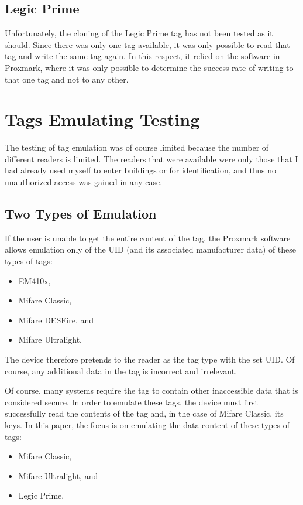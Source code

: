 \subsection{Legic Prime}

Unfortunately, the cloning of the Legic Prime tag has not been tested as it should. Since there was only one tag available, it was only possible to read that tag and write the same tag again. In this respect, it relied on the software in Proxmark, where it was only possible to determine the success rate of writing to that one tag and not to any other.


\section{Tags Emulating Testing}

The testing of tag emulation was of course limited because the number of different readers is limited. The readers that were available were only those that I had already used myself to enter buildings or for identification, and thus no unauthorized access was gained in any case.

\subsection{Two Types of Emulation}
\label{subsec:twotypes}

If the user is unable to get the entire content of the tag, the Proxmark software allows emulation only of the UID (and its associated manufacturer data) of these types of tags:

\begin{itemize}
    \item EM410x,
    \item Mifare Classic,
    \item Mifare DESFire, and
    \item Mifare Ultralight.
\end{itemize}
The device therefore pretends to the reader as the tag type with the set UID. Of course, any additional data in the tag is incorrect and irrelevant.

Of course, many systems require the tag to contain other inaccessible data that is considered secure. In order to emulate these tags, the device must first successfully read the contents of the tag and, in the case of Mifare Classic, its keys. In this paper, the focus is on emulating the data content of these types of tags:

\begin{itemize}
    \item Mifare Classic,
    \item Mifare Ultralight, and
    \item Legic Prime.
\end{itemize}

